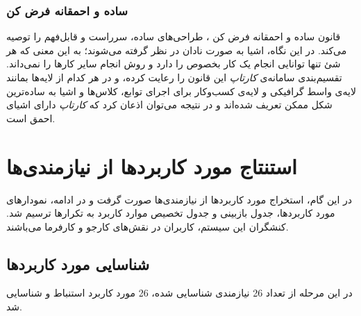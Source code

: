 \documentclass[12pt,svgnames,oneside]{book}
\begin{document}
\subsection{ساده و احمقانه فرض کن}
قانون ساده و احمقانه فرض کن
، طراحی‌های ساده، سرراست و قابل‌فهم را توصیه می‌کند. در این نگاه، اشیا به صورت نادان در نظر گرفته می‌شوند؛ به این معنی که هر شئ تنها توانایی انجام یک کار بخصوص را دارد و روش انجام سایر کار‌ها را نمی‌داند. تقسیم‌بندی سامانه‌ی \textit{کارتاپ} این قانون را رعایت کرده، و در هر کدام از لایه‌ها بمانند لایه‌ی واسط گرافیکی و لایه‌ی کسب‌وکار برای اجرای توابع، کلاس‌ها و اشیا به ساده‌ترین شکل ممکن تعریف شده‌اند و در نتیجه می‌توان اذعان کرد که \textit{کارتاپ} دارای اشیای احمق است.



\chapter{استنتاج مورد کاربرد‌ها از نیازمندی‌‌ها}		
در این گام، استخراج مورد کاربرد‌ها از نیازمندی‌ها صورت گرفت و در ادامه، نمودار‌‌های مورد کاربرد‌ها، جدول بازبینی و جدول تخصیص موارد کاربرد به تکرار‌‌ها ترسیم شد. کنشگران این سیستم، کاربران در نقش‌های کارجو و کارفرما می‌باشند.

\section{شناسایی مورد کاربرد‌ها}		
در این مرحله از تعداد 26 نیازمندی شناسایی شده، 26 مورد کاربرد استنباط و شناسایی شد.
\end{document}
